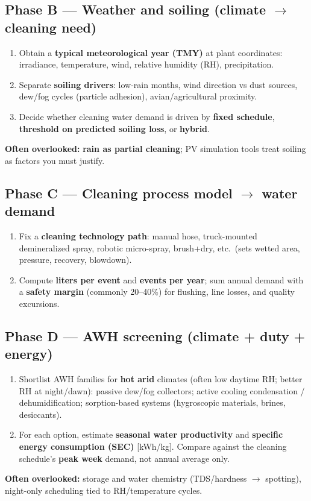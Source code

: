 \documentclass[11pt,a4paper]{article}
\begin{document}
\subsection{Phase B --- Weather and soiling (climate $\rightarrow$ cleaning need)}
\begin{enumerate}[resume,leftmargin=*]
  \item Obtain a \textbf{typical meteorological year (TMY)} at plant coordinates: irradiance, temperature, wind, relative humidity (RH), precipitation.
  \item Separate \textbf{soiling drivers}: low-rain months, wind direction vs dust sources, dew/fog cycles (particle adhesion), avian/agricultural proximity.
  \item Decide whether cleaning water demand is driven by \textbf{fixed schedule}, \textbf{threshold on predicted soiling loss}, or \textbf{hybrid}.
\end{enumerate}
\textbf{Often overlooked:} \textbf{rain as partial cleaning}; PV simulation tools treat soiling as factors you must justify.

\subsection{Phase C --- Cleaning process model $\rightarrow$ water demand}
\begin{enumerate}[resume,leftmargin=*]
  \item Fix a \textbf{cleaning technology path}: manual hose, truck-mounted demineralized spray, robotic micro-spray, brush+dry, etc.\ (sets wetted area, pressure, recovery, blowdown).
  \item Compute \textbf{liters per event} and \textbf{events per year}; sum annual demand with a \textbf{safety margin} (commonly 20--40\%) for flushing, line losses, and quality excursions.
\end{enumerate}

\subsection{Phase D --- AWH screening (climate + duty + energy)}
\begin{enumerate}[resume,leftmargin=*]
  \item Shortlist AWH families for \textbf{hot arid} climates (often low daytime RH; better RH at night/dawn):
  passive dew/fog collectors; active cooling condensation / dehumidification; sorption-based systems (hygroscopic materials, brines, desiccants).
  \item For each option, estimate \textbf{seasonal water productivity} and \textbf{specific energy consumption (SEC)} [kWh/kg]. Compare against the cleaning schedule's \textbf{peak week} demand, not annual average only.
\end{enumerate}
\textbf{Often overlooked:} storage and water chemistry (TDS/hardness $\rightarrow$ spotting), night-only scheduling tied to RH/temperature cycles.
\end{document}
